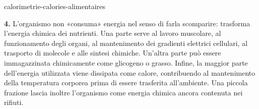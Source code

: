 \begin{exo}{calorimetrie-calories-alimentaires}
\begin{solution}
\textbf{4.} L'organismo non «consuma» energia nel senso di farla scomparire: trasforma l'energia chimica dei nutrienti. Una parte serve al lavoro muscolare, al funzionamento degli organi, al mantenimento dei gradienti elettrici cellulari, al trasporto di molecole e alle sintesi chimiche. Un'altra parte può essere immagazzinata chimicamente come glicogeno o grasso. Infine, la maggior parte dell'energia utilizzata viene dissipata come calore, contribuendo al mantenimento della temperatura corporea prima di essere trasferita all'ambiente. Una piccola frazione lascia inoltre l'organismo come energia chimica ancora contenuta nei rifiuti.
\end{solution}
\end{exo}
